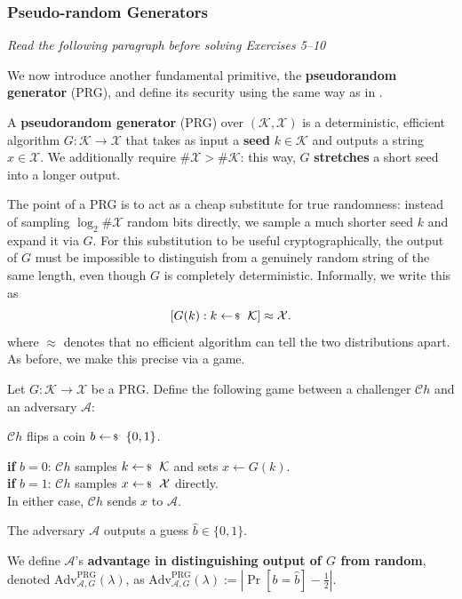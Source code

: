 \documentclass[../../book.tex]{subfiles}
\begin{document}
\subsubsection*{Pseudo-random Generators}

\textit{Read the following paragraph before solving Exercises 5--10}

We now introduce another fundamental primitive, the \textbf{pseudorandom generator} 
(PRG), and define its security using the same way as in .

\begin{definition}
    A \textbf{pseudorandom generator} (PRG) over $(\mathcal{K},\mathcal{X})$ is a deterministic, efficient algorithm 
    $G: \mathcal{K} \to \mathcal{X}$ that takes as input a \textbf{seed} $k \in \mathcal{K}$ and 
    outputs a string $x \in \mathcal{X}$. We additionally require $\#\mathcal{X}>\#\mathcal{K}$: this way, $G$ 
    \textbf{stretches} a short seed into a longer output.
\end{definition}

The point of a PRG is to act as a cheap substitute for true randomness: instead of sampling 
$\log_2 \#\mathcal{X}$ random bits directly, we sample a much shorter seed $k$ and expand it via $G$. For this 
substitution to be useful cryptographically, the output of $G$ must be impossible to 
distinguish from a genuinely random string of the same length, even though $G$ is completely 
deterministic. Informally, we write this as
\begin{equation*}
    \left[G(k): k \leftarrowS \mathcal{K}\right] \approx \mathcal{X}.
\end{equation*}
where $\approx$ denotes that no efficient algorithm can tell the two distributions apart. As 
before, we make this precise via a game.

\begin{definition}
    Let $G: \mathcal{K} \to \mathcal{X}$ be a PRG.
    Define the following game between a challenger $\mathcal{C}h$ and an adversary $\mathcal{A}$:
    \begin{algoen}
        \item $\mathcal{C}h$ flips a coin $b \leftarrowS \{0,1\}$.
        \item \textbf{if} $b = 0$: $\mathcal{C}h$ samples $k \leftarrowS \mathcal{K}$ and sets 
        $x \gets G(k)$. \\
        \textbf{if} $b = 1$: $\mathcal{C}h$ samples $x \leftarrowS \mathcal{X}$ directly. \\
        In either case, $\mathcal{C}h$ sends $x$ to $\mathcal{A}$.
        \item The adversary $\mathcal{A}$ outputs a guess $\widehat{b} \in \{0,1\}$.
    \end{algoen}

    We define $\mathcal{A}$'s \textbf{advantage in distinguishing output of $G$ from random}, denoted 
    $\text{Adv}^{\text{PRG}}_{\mathcal{A},G}(\lambda)$, as $\text{Adv}^{\text{PRG}}_{\mathcal{A},G}(\lambda) := \left| \Pr[b = \widehat{b}] - \frac{1}{2} \right|$.
\end{definition}
\end{document}

